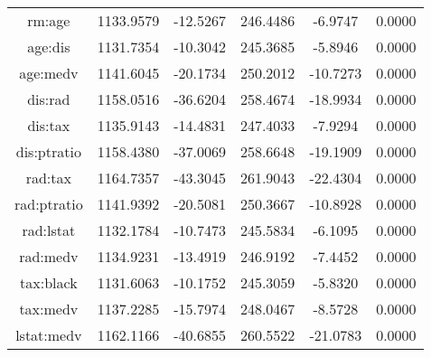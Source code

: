 \begin{longtable}{c|c|c|c|c|c}
      rm:age & 1133.9579 &  -12.5267 & 246.4486 &   -6.9747 &          0.0000 \\
     age:dis & 1131.7354 &  -10.3042 & 245.3685 &   -5.8946 &          0.0000 \\
    age:medv & 1141.6045 &  -20.1734 & 250.2012 &  -10.7273 &          0.0000 \\
     dis:rad & 1158.0516 &  -36.6204 & 258.4674 &  -18.9934 &          0.0000 \\
     dis:tax & 1135.9143 &  -14.4831 & 247.4033 &   -7.9294 &          0.0000 \\
 dis:ptratio & 1158.4380 &  -37.0069 & 258.6648 &  -19.1909 &          0.0000 \\
     rad:tax & 1164.7357 &  -43.3045 & 261.9043 &  -22.4304 &          0.0000 \\
 rad:ptratio & 1141.9392 &  -20.5081 & 250.3667 &  -10.8928 &          0.0000 \\
   rad:lstat & 1132.1784 &  -10.7473 & 245.5834 &   -6.1095 &          0.0000 \\
    rad:medv & 1134.9231 &  -13.4919 & 246.9192 &   -7.4452 &          0.0000 \\
   tax:black & 1131.6063 &  -10.1752 & 245.3059 &   -5.8320 &          0.0000 \\
    tax:medv & 1137.2285 &  -15.7974 & 248.0467 &   -8.5728 &          0.0000 \\
  lstat:medv & 1162.1166 &  -40.6855 & 260.5522 &  -21.0783 &          0.0000 \\
\end{longtable}
